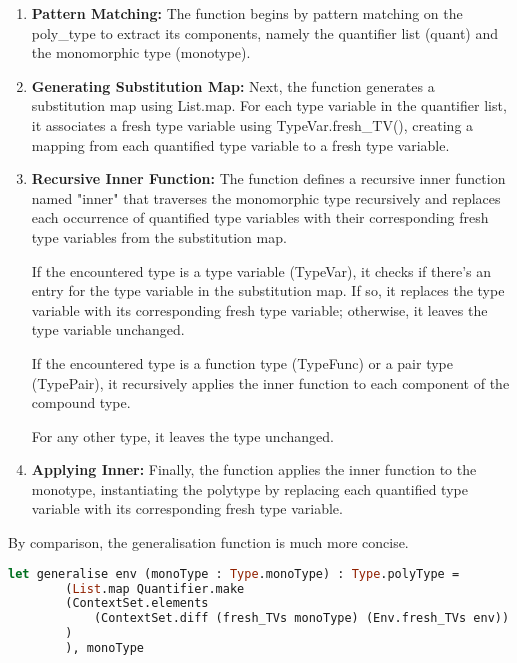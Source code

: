 \documentclass{l4proj}
\begin{document}
\begin{enumerate}
    \item \textbf{Pattern Matching:} The function begins by pattern matching on the poly\_type to extract its components, namely the quantifier list (quant) and the monomorphic type (monotype).
    
    \item \textbf{Generating Substitution Map:} Next, the function generates a substitution map using List.map.
    For each type variable in the quantifier list, it associates a fresh type variable using TypeVar.fresh\_TV(), creating a mapping from each quantified type variable to a fresh type variable.

    \item \textbf{Recursive Inner Function:} The function defines a recursive inner function named "inner" that traverses the monomorphic type recursively and replaces each occurrence of quantified type variables with their corresponding fresh type variables from the substitution map.

    If the encountered type is a type variable (TypeVar), it checks if there's an entry for the type variable in the substitution map.
    If so, it replaces the type variable with its corresponding fresh type variable; otherwise, it leaves the type variable unchanged.
    
    If the encountered type is a function type (TypeFunc) or a pair type (TypePair), it recursively applies the inner function to each component of the compound type.

    For any other type, it leaves the type unchanged.

    \item \textbf{Applying Inner:} 
    Finally, the function applies the inner function to the monotype, instantiating the polytype by replacing each quantified type variable with its corresponding fresh type variable.
\end{enumerate}

By comparison, the generalisation function is much more concise.

\begin{lstlisting}[language=Caml, caption=PyFunc's generalisation function implemenation.]
    let generalise env (monoType : Type.monoType) : Type.polyType =
        (List.map Quantifier.make 
        (ContextSet.elements 
            (ContextSet.diff (fresh_TVs monoType) (Env.fresh_TVs env))
        )
        ), monoType
\end{lstlisting}
\end{document}
